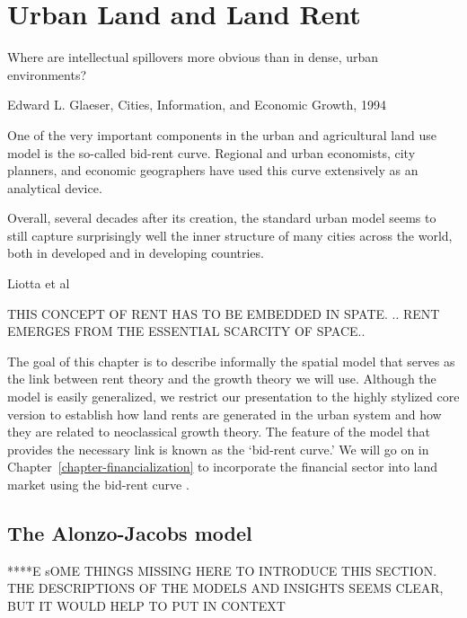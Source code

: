 \chapter{Urban Land and Land Rent} \label{chapter-space}
\epigraph{Where are intellectual spillovers more obvious than in dense, urban environments?}{Edward L. Glaeser,\cite{glaeserCitiesInformationEconomic1994} Cities, Information, and Economic Growth, 1994}
\epigraph{One of the very important components in the urban and agricultural land use model is the so-called \gls{bid-rent curve}. Regional and urban economists, city planners, and economic geographers have used this curve extensively as an analytical device.}{\cite{shiehWilhelmLaunhardtBidRent2004}}

\epigraph{Overall, several decades after its creation, the standard urban model seems to still capture surprisingly well the inner structure of many cities across the world, both in developed and in developing countries.}{Liotta et al \cite{liottaTestingMonocentricStandard2022}}


THIS CONCEPT OF RENT HAS TO BE EMBEDDED IN SPATE.
.. RENT EMERGES FROM THE ESSENTIAL SCARCITY OF SPACE..

The goal of this chapter is to describe informally the spatial model that serves as the link between rent theory and the growth theory we will use.  Although the model is easily generalized, we restrict our presentation to the highly  stylized core version to establish how land rents are generated in the urban system and how they are related to neoclassical growth theory. The feature of the model that provides the necessary link is known as the `\gls{bid-rent curve}.' We will go on in Chapter~\ref{chapter-financialization} to incorporate  the  financial sector into  land market using the bid-rent  curve .



\section{The Alonzo-Jacobs model}

****E sOME THINGS MISSING HERE TO INTRODUCE THIS SECTION. THE DESCRIPTIONS OF THE MODELS AND INSIGHTS SEEMS CLEAR, BUT IT WOULD HELP TO PUT IN CONTEXT

